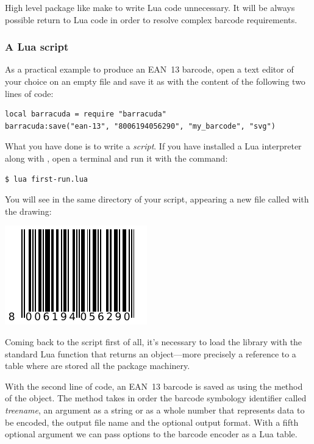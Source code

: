 \documentclass[11pt,a4paper]{article}
\begin{document}
High level package like  make to write Lua code unnecessary.
It will be always possible return to Lua code in order to resolve complex
barcode requirements.


\subsubsection{A Lua script}

As a practical example to produce an EAN~13 barcode, open a text editor of your
choice on an empty file and save it as  with the content of
the following two lines of code:
\medskip
\begin{Verbatim}[label=\footnotesize\code{first-run.lua}]
local barracuda = require "barracuda"
barracuda:save("ean-13", "8006194056290", "my_barcode", "svg")
\end{Verbatim}

What you have done is to write a \emph{script}. If you have installed a Lua
interpreter along with \brcd{}, open a terminal and run it with the command:
\begin{Verbatim}
$ lua first-run.lua
\end{Verbatim}

You will see in the same directory of your script, appearing a new file called
 with the drawing:
\begin{center}
\includegraphics{image/8006194056290}
\end{center}

Coming back to the script first of all, it's necessary to load the library
\brcd{} with the standard Lua function  that returns an
object---more precisely a reference to a table where are stored all the
package machinery.

With the second line of code, an EAN~13 barcode is saved as
 using the method  of the \brcd{} object. The
 method takes in order the barcode symbology identifier called
\emph{treename}, an argument as a string or as a whole number that represents
data to be encoded, the output file name and the optional output format. With a
fifth optional argument we can pass options to the barcode encoder as a Lua
table.
\end{document}

